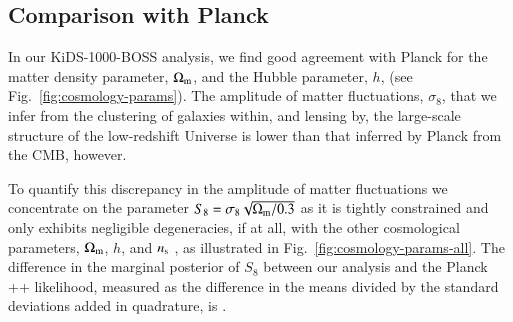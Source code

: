 \subsection{Comparison with Planck}
\label{sec:planck_comp}

In our KiDS-1000-BOSS \tttp analysis, we find good agreement with Planck for the matter density parameter, $\Omega_{\rm m}$, and the Hubble parameter, $h$, (see Fig.~\ref{fig:cosmology-params}).
The amplitude of matter fluctuations, $\sigma_8$, that we infer from the clustering of galaxies within, and lensing by, the large-scale structure of the low-redshift Universe is lower than that inferred by Planck from the CMB, however. 

To quantify this discrepancy in the amplitude of matter fluctuations we concentrate on the parameter $S_{8} = \sigma_8 \sqrt{\Omega_{\rm m}/0.3}$ as it is tightly constrained and only exhibits negligible degeneracies, if at all, with the other cosmological parameters, $\Omega_{\rm m}$, $h$, and $n_{\rm s}$ , as illustrated in Fig.~\ref{fig:cosmology-params-all}. 
%
The difference in the marginal posterior of $S_{8}$ between our \tttp analysis and the Planck ++ likelihood, measured as the difference in the means divided by the standard deviations added in quadrature, is \kpoff.


